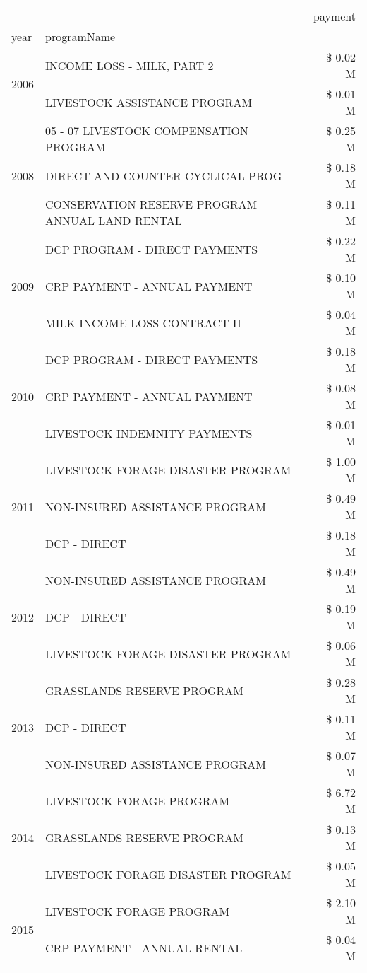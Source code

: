 \begin{tabular}{llr}
\toprule
 &  & payment \\
year & programName &  \\
\midrule
\multirow[t]{2}{*}{2006} & INCOME LOSS - MILK, PART 2 & \$ 0.02 M \\
 & LIVESTOCK ASSISTANCE PROGRAM & \$ 0.01 M \\
\cline{1-3}
\multirow[t]{3}{*}{2008} & 05 - 07 LIVESTOCK COMPENSATION PROGRAM & \$ 0.25 M \\
 & DIRECT AND COUNTER CYCLICAL PROG & \$ 0.18 M \\
 & CONSERVATION RESERVE PROGRAM - ANNUAL LAND RENTAL & \$ 0.11 M \\
\cline{1-3}
\multirow[t]{3}{*}{2009} & DCP PROGRAM - DIRECT PAYMENTS & \$ 0.22 M \\
 & CRP PAYMENT - ANNUAL PAYMENT & \$ 0.10 M \\
 & MILK INCOME LOSS CONTRACT II & \$ 0.04 M \\
\cline{1-3}
\multirow[t]{3}{*}{2010} & DCP PROGRAM - DIRECT PAYMENTS & \$ 0.18 M \\
 & CRP PAYMENT - ANNUAL PAYMENT & \$ 0.08 M \\
 & LIVESTOCK INDEMNITY PAYMENTS & \$ 0.01 M \\
\cline{1-3}
\multirow[t]{3}{*}{2011} & LIVESTOCK FORAGE DISASTER PROGRAM & \$ 1.00 M \\
 & NON-INSURED ASSISTANCE PROGRAM & \$ 0.49 M \\
 & DCP - DIRECT & \$ 0.18 M \\
\cline{1-3}
\multirow[t]{3}{*}{2012} & NON-INSURED ASSISTANCE PROGRAM & \$ 0.49 M \\
 & DCP - DIRECT & \$ 0.19 M \\
 & LIVESTOCK FORAGE DISASTER PROGRAM & \$ 0.06 M \\
\cline{1-3}
\multirow[t]{3}{*}{2013} & GRASSLANDS RESERVE PROGRAM & \$ 0.28 M \\
 & DCP - DIRECT & \$ 0.11 M \\
 & NON-INSURED ASSISTANCE PROGRAM & \$ 0.07 M \\
\cline{1-3}
\multirow[t]{3}{*}{2014} & LIVESTOCK FORAGE PROGRAM & \$ 6.72 M \\
 & GRASSLANDS RESERVE PROGRAM & \$ 0.13 M \\
 & LIVESTOCK FORAGE DISASTER PROGRAM & \$ 0.05 M \\
\cline{1-3}
\multirow[t]{3}{*}{2015} & LIVESTOCK FORAGE PROGRAM & \$ 2.10 M \\
 & CRP PAYMENT - ANNUAL RENTAL & \$ 0.04 M \\

\end{tabular}
